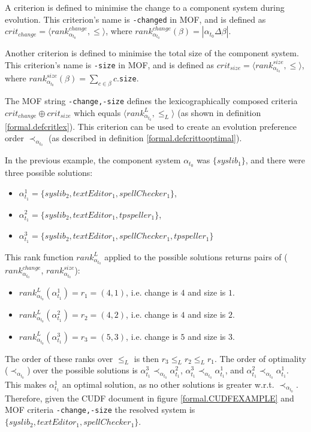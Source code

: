 A criterion is defined to minimise the change to a component system during evolution.
This criterion's name is \texttt{-changed} in MOF,
and is defined as $crit_{change} = \langle rank^{change}_{\alpha_{t_{0}}}, \leq \rangle$,
where $rank^{change}_{\alpha_{t_{0}}}(\beta) = |\alpha_{t_{0}} \Delta \beta|$.

Another criterion is defined to minimise the total size of the component system.
This criterion's name is \texttt{-size} in MOF,
and is defined as $crit_{size} = \langle rank^{size}_{\alpha_{t_{0}}}, \leq  \rangle$,
where $rank^{size}_{\alpha_{t_{0}}}(\beta) = \sum_{c \in \beta} c$.\verb+size+.
 
The MOF string \texttt{-change,-size} defines the lexicographically composed criteria $crit_{change} \oplus crit_{size}$ 
which equals $\langle rank^{L}_{\alpha_{t_{0}}}, \leq_L \rangle$ (as shown in definition \ref{formal.defcritlex}).
This criterion can be used to create an evolution preference order $\prec_{\alpha_{t_{0}}}$ (as described in definition \ref{formal.defcrittooptimal}).

In the previous example, the component system $\alpha_{t_{0}}$ was  $\{syslib_1\}$, and there were three possible solutions:
\begin{itemize}
  \item $\alpha_{t_1}^1 = \{syslib_2, textEditor_1, spellChecker_1\}$,
  \item $\alpha_{t_1}^2 = \{syslib_2, textEditor_1, tpspeller_1\}$,
  \item $\alpha_{t_1}^3 = \{syslib_2, textEditor_1, spellChecker_1, tpspeller_1\}$
\end{itemize}

This rank function $rank^{L}_{\alpha_{t_{0}}}$ applied to the possible solutions returns pairs of ($rank^{change}_{\alpha_{t_{0}}}$, $rank^{size}_{\alpha_{t_{0}}}$):
\begin{itemize}
  \item $rank^{L}_{\alpha_{t_{0}}}(\alpha_{t_1}^1 ) = r_1 = (4, 1)$, i.e. change is $4$ and size is $1$.
  \item $rank^{L}_{\alpha_{t_{0}}}(\alpha_{t_1}^2 ) = r_2 = (4, 2)$, i.e. change is $4$ and size is $2$.
  \item $rank^{L}_{\alpha_{t_{0}}}(\alpha_{t_1}^3 ) = r_3 = (5, 3)$, i.e. change is $5$ and size is $3$.
\end{itemize}
The order of these ranks over $\leq_L$ is then $r_3 \leq_L r_2 \leq_L r_1$.
The order of optimality ($\prec_{\alpha_{t_{0}}}$) over the possible solutions is $\alpha_{t_1}^3 \prec_{\alpha_{t_{0}}} \alpha_{t_1}^2$, 
$\alpha_{t_1}^3 \prec_{\alpha_{t_{0}}} \alpha_{t_1}^1$, and $\alpha_{t_1}^2 \prec_{\alpha_{t_{0}}} \alpha_{t_1}^1$.
This makes $\alpha_{t_1}^1$ an optimal solution, as no other solutions is greater w.r.t. $\prec_{\alpha_{t_{0}}}$. 
Therefore, given the CUDF document in figure \ref{formal.CUDFEXAMPLE} and MOF criteria \texttt{-change,-size} the resolved system is $\{syslib_2, textEditor_1, spellChecker_1\}$.

